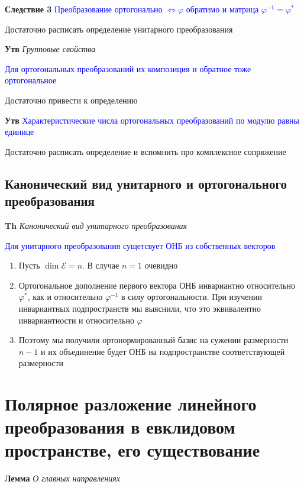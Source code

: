 \documentclass[a4paper, 14pt]{article}
\begin{document}
    \textbf{Следствие 3} \textcolor{blue}{Преобразование ортогонально $\Leftrightarrow \varphi$ обратимо и
    матрица $\varphi^{-1} = \varphi^*$}
    
    Достаточно расписать определение унитарного преобразования
    
    \textbf{Утв} \textit{Групповые свойства}
    
    \textcolor{blue}{Для ортогональных преобразований их композиция и обратное тоже ортогональное}
    
    Достаточно привести к определению
    
    \textbf{Утв} \textcolor{blue}{Характеристические числа ортогональных преобразований по модулю равны единице}
    
    Достаточно расписать определение и вспомнить про комплексное сопряжение
    
    \subsection{Канонический вид унитарного и ортогонального преобразования}
    
    \textbf{Th} \textit{Канонический вид унитарного преобразования}
    
    \textcolor{blue}{Для унитарного преобразования сущетсвует ОНБ из собственных векторов}
    
    \begin{enumerate}
        \item Пусть $\dim \mathscr{E} = n$.
        В случае $n = 1$ очевидно
        \item Ортогональное дополнение первого вектора ОНБ инвариантно относительно $\varphi^*$, как и относительно $\varphi^{-1}$ в
        силу ортогональности.
        При изучении инвариантных подпространств мы выяснили, что это эквивалентно инвариантности и относительно $\varphi$
        \item Поэтому мы получили ортонормированный базис на сужении размерности $n - 1$ и их объединение будет ОНБ на
        подпространстве соответствующей размерности
    \end{enumerate}
    
    \section{Полярное разложение линейного преобразования в евклидовом пространстве, его существование}
    
    \textbf{Лемма} \textit{О главных направлениях}
    
\end{document}
